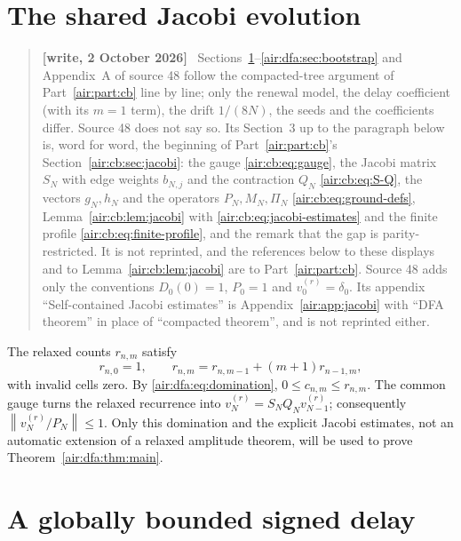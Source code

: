 \documentclass[11pt,letterpaper]{article}
\numberwithin{equation}{section}
\theoremstyle{remark}
\newcommand{\norm}[1]{\left\lVert#1\right\rVert}
\newenvironment{writenote}{\par\smallskip\begin{quote}\small\textbf{[write, 2 October 2026]}\ }{\end{quote}\smallskip}
\begin{document}
\section{The shared Jacobi evolution}\label{air:dfa:sec:jacobi}

\begin{writenote}
Sections~\ref{air:dfa:sec:jacobi}--\ref{air:dfa:sec:bootstrap} and Appendix~A of source 48 follow the compacted-tree argument of Part~\ref{air:part:cb} line by line; only the renewal model, the delay coefficient (with its $m=1$ term), the drift $1/(8N)$, the seeds and the coefficients differ. Source 48 does not say so. Its Section~3 up to the paragraph below is, word for word, the beginning of Part~\ref{air:part:cb}'s Section~\ref{air:cb:sec:jacobi}: the gauge \eqref{air:cb:eq:gauge}, the Jacobi matrix $S_N$ with edge weights $b_{N,j}$ and the contraction $Q_N$ \eqref{air:cb:eq:S-Q}, the vectors $g_N,h_N$ and the operators $P_N,M_N,\Pi_N$ \eqref{air:cb:eq:ground-defs}, Lemma~\ref{air:cb:lem:jacobi} with \eqref{air:cb:eq:jacobi-estimates} and the finite profile \eqref{air:cb:eq:finite-profile}, and the remark that the gap is parity-restricted. It is not reprinted, and the references below to these displays and to Lemma~\ref{air:cb:lem:jacobi} are to Part~\ref{air:part:cb}. Source 48 adds only the conventions $D_0(0)=1$, $P_0=1$ and $v_0^{(r)}=\delta_0$. Its appendix ``Self-contained Jacobi estimates'' is Appendix~\ref{air:app:jacobi} with ``DFA theorem'' in place of ``compacted theorem'', and is not reprinted either.
\end{writenote}
The relaxed counts $r_{n,m}$ satisfy
\[
r_{n,0}=1,\qquad r_{n,m}=r_{n,m-1}+(m+1)r_{n-1,m},
\]
with invalid cells zero. By \eqref{air:dfa:eq:domination}, $0\le c_{n,m}\le r_{n,m}$. The common
gauge turns the relaxed recurrence into $v_N^{(r)}=S_NQ_Nv_{N-1}^{(r)}$;
consequently $\norm{v_N^{(r)}/P_N}\le1$. Only this domination and the explicit
Jacobi estimates, not an automatic extension of a relaxed amplitude theorem,
will be used to prove Theorem~\ref{air:dfa:thm:main}.

\section{A globally bounded signed delay}\label{air:dfa:sec:delay}
\end{document}
